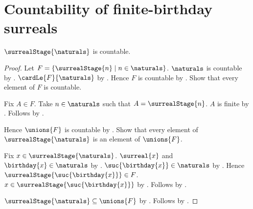 \section{Countability of finite-birthday surreals}




\begin{theorem}\label{finite_birthday_surreals_are_countable}
    $\surrealStage{\naturals}$ is countable.
\end{theorem}
\begin{proof}
    Let $F=\{\surrealStage{n}\mid n\in\naturals\}$.
    $\naturals$ is countable by .
    $\cardLe{F}{\naturals}$ by .
    Hence $F$ is countable by .
    Show that every element of $F$ is countable.
    \begin{subproof}
        Fix $A\in F$.
        Take $n\in\naturals$ such that $A=\surrealStage{n}$.
        $A$ is finite by .
        Follows by .
    \end{subproof}
    Hence $\unions{F}$ is countable by .
    Show that every element of $\surrealStage{\naturals}$ is an element of $\unions{F}$.
    \begin{subproof}
        Fix $x\in\surrealStage{\naturals}$.
        $\surreal{x}$ and $\birthday{x}\in\naturals$ by
            .
        $\suc{\birthday{x}}\in\naturals$ by .
        Hence $\surrealStage{\suc{\birthday{x}}}\in F$.
        $x\in\surrealStage{\suc{\birthday{x}}}$ by .
        Follows by .
    \end{subproof}
    $\surrealStage{\naturals}\subseteq\unions{F}$ by .
    Follows by .
\end{proof}
